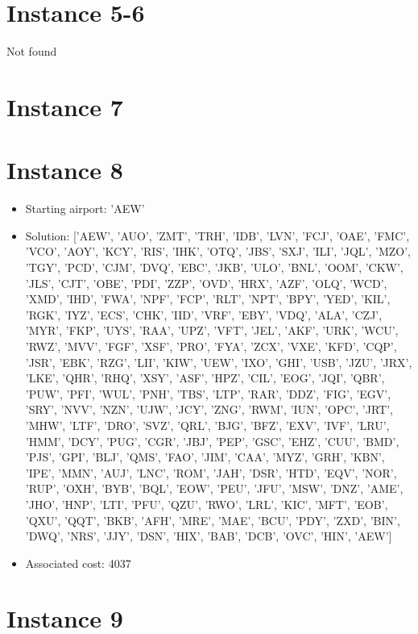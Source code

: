 \section*{Instance 5-6}

Not found

\section*{Instance 7}
\section*{Instance 8}
\begin{itemize}
    \item Starting airport: 'AEW'
    \item Solution: ['AEW', 'AUO', 'ZMT', 'TRH', 'IDB', 'LVN', 'FCJ', 'OAE', 'FMC', 'VCO', 'AOY', 'KCY', 'RIS', 'IHK', 'OTQ', 'JBS', 'SXJ', 'ILI', 'JQL', 'MZO', 'TGY', 'PCD', 'CJM', 'DVQ', 'EBC', 'JKB', 'ULO', 'BNL', 'OOM', 'CKW', 'JLS', 'CJT', 'OBE', 'PDI', 'ZZP', 'OVD', 'HRX', 'AZF', 'OLQ', 'WCD', 'XMD', 'IHD', 'FWA', 'NPF', 'FCP', 'RLT', 'NPT', 'BPY', 'YED', 'KIL', 'RGK', 'IYZ', 'ECS', 'CHK', 'IID', 'VRF', 'EBY', 'VDQ', 'ALA', 'CZJ', 'MYR', 'FKP', 'UYS', 'RAA', 'UPZ', 'VFT', 'JEL', 'AKF', 'URK', 'WCU', 'RWZ', 'MVV', 'FGF', 'XSF', 'PRO', 'FYA', 'ZCX', 'VXE', 'KFD', 'CQP', 'JSR', 'EBK', 'RZG', 'LII', 'KIW', 'UEW', 'IXO', 'GHI', 'USB', 'JZU', 'JRX', 'LKE', 'QHR', 'RHQ', 'XSY', 'ASF', 'HPZ', 'CIL', 'EOG', 'JQI', 'QBR', 'PUW', 'PFI', 'WUL', 'PNH', 'TBS', 'LTP', 'RAR', 'DDZ', 'FIG', 'EGV', 'SRY', 'NVV', 'NZN', 'UJW', 'JCY', 'ZNG', 'RWM', 'IUN', 'OPC', 'JRT', 'MHW', 'LTF', 'DRO', 'SVZ', 'QRL', 'BJG', 'BFZ', 'EXV', 'IVF', 'LRU', 'HMM', 'DCY', 'PUG', 'CGR', 'JBJ', 'PEP', 'GSC', 'EHZ', 'CUU', 'BMD', 'PJS', 'GPI', 'BLJ', 'QMS', 'FAO', 'JIM', 'CAA', 'MYZ', 'GRH', 'KBN', 'IPE', 'MMN', 'AUJ', 'LNC', 'ROM', 'JAH', 'DSR', 'HTD', 'EQV', 'NOR', 'RUP', 'OXH', 'BYB', 'BQL', 'EOW', 'PEU', 'JFU', 'MSW', 'DNZ', 'AME', 'JHO', 'HNP', 'LTI', 'PFU', 'QZU', 'RWO', 'LRL', 'KIC', 'MFT', 'EOB', 'QXU', 'QQT', 'BKB', 'AFH', 'MRE', 'MAE', 'BCU', 'PDY', 'ZXD', 'BIN', 'DWQ', 'NRS', 'JJY', 'DSN', 'HIX', 'BAB', 'DCB', 'OVC', 'HIN', 'AEW']
    \item Associated cost: 4037
\end{itemize}
\section*{Instance 9}



